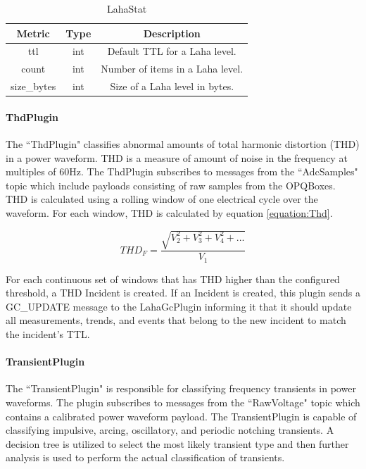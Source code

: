 \begin{table}[H]
	\centering
	\caption{LahaStat}
	\begin{tabular}{|c|c|c|}
		\hline 
		Metric & Type & Description \\ 
		\hline
		ttl & int & Default TTL for a Laha level. \\
		\hline
		count & int & Number of items in a Laha level. \\
		\hline
		size\_bytes & int & Size of a Laha level in bytes. \\
		\hline
	\end{tabular} 
	\label{table:MetricsLaha}
\end{table}

\paragraph{ThdPlugin}
The ``ThdPlugin" classifies abnormal amounts of total harmonic distortion (THD) in a power waveform. THD is a measure of amount of noise in the frequency at multiples of 60Hz. The ThdPlugin subscribes to messages from the ``AdcSamples" topic which include payloads consisting of raw samples from the OPQBoxes. THD is calculated using a rolling window of one electrical cycle over the waveform. For each window, THD is calculated by equation \ref{equation:Thd}.

\begin{equation}
\label{equation:Thd}
	THD_F = \frac{\sqrt{V_2^2 + V_3^2 + V_4^2 + ...}}{V_1}
\end{equation}

For each continuous set of windows that has THD higher than the configured threshold, a THD Incident is created. If an Incident is created, this plugin sends a GC\_UPDATE message to the LahaGcPlugin informing it that it should update all measurements, trends, and events that belong to the new incident to match the incident's TTL.


\paragraph{TransientPlugin}
The ``TransientPlugin" is responsible for classifying frequency transients in power waveforms. The plugin subscribes to messages from the ``RawVoltage" topic which contains a calibrated power waveform payload. The TransientPlugin is capable of classifying impulsive, arcing, oscillatory, and periodic notching transients. A decision tree is utilized to select the most likely transient type and then further analysis is used to perform the actual classification of transients.

